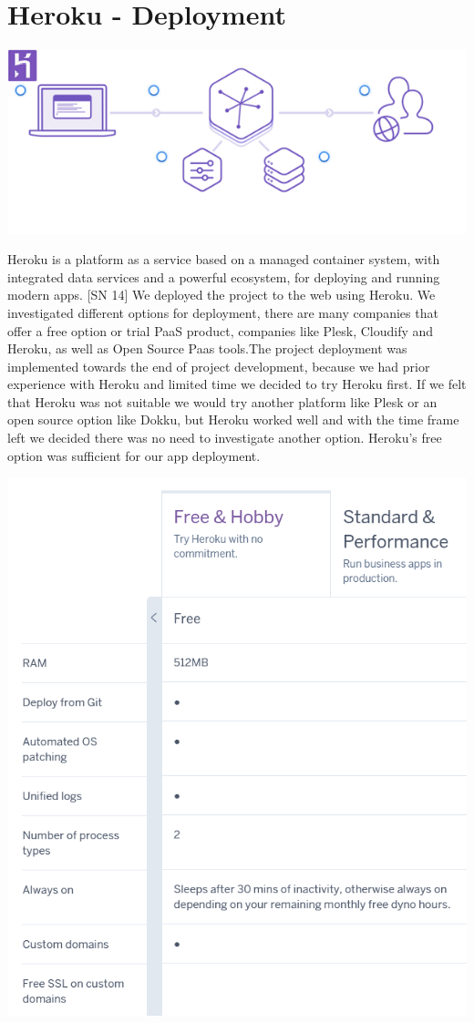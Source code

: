 \section{Heroku - Deployment}
\begin{center}    
      \includegraphics{img/HerokuArchitecture.png}
\end{center}
Heroku is a platform as a service based on a managed container system, with integrated data services and a powerful ecosystem, for deploying and running modern apps. [SN 14] 
We deployed the project to the web using Heroku. We investigated different options for deployment, there are many companies that offer a free option or trial PaaS product, companies like Plesk, Cloudify and Heroku, as well as Open Source Paas tools.The project deployment was implemented towards the end of project development, because we had prior experience with Heroku and limited time we decided to try Heroku first. If we felt that Heroku was not suitable we would try another platform like Plesk or an open source option like Dokku, but Heroku worked well and with the time frame left we decided there was no need to investigate another option. Heroku's free option was sufficient for our app deployment.
\begin{center}    
      \includegraphics[scale=0.6]{img/HerokuStats.PNG}
\end{center}

